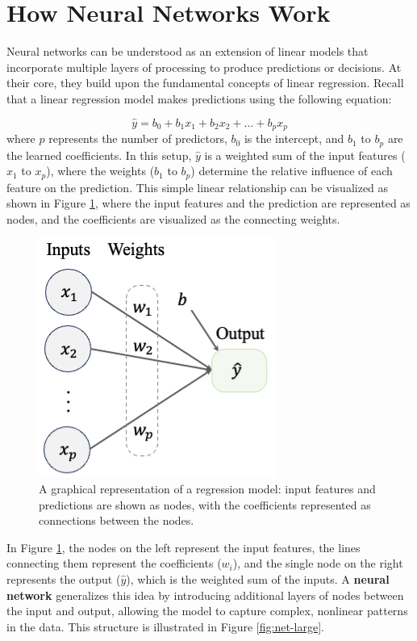 \documentclass[
]{book}
\theoremstyle{definition}
\theoremstyle{definition}
\theoremstyle{definition}
\theoremstyle{definition}
\theoremstyle{remark}
\begin{document}
\section{How Neural Networks Work}\label{how-neural-networks-work}

Neural networks can be understood as an extension of linear models that incorporate multiple layers of processing to produce predictions or decisions. At their core, they build upon the fundamental concepts of linear regression. Recall that a linear regression model makes predictions using the following equation:

\[
\hat{y} = b_0 + b_1 x_1 + b_2 x_2 + \dots + b_p x_p
\]
where \(p\) represents the number of predictors, \(b_0\) is the intercept, and \(b_1\) to \(b_p\) are the learned coefficients. In this setup, \(\hat{y}\) is a weighted sum of the input features (\(x_1\) to \(x_p\)), where the weights (\(b_1\) to \(b_p\)) determine the relative influence of each feature on the prediction. This simple linear relationship can be visualized as shown in Figure \ref{fig:net-reg}, where the input features and the prediction are represented as nodes, and the coefficients are visualized as the connecting weights.

\begin{figure}

{\centering \includegraphics[width=0.4\linewidth]{images/net_reg} 

}

\caption{A graphical representation of a regression model: input features and predictions are shown as nodes, with the coefficients represented as connections between the nodes.}\label{fig:net-reg}
\end{figure}

In Figure \ref{fig:net-reg}, the nodes on the left represent the input features, the lines connecting them represent the coefficients (\(w_i\)), and the single node on the right represents the output (\(\hat{y}\)), which is the weighted sum of the inputs. A \textbf{neural network} generalizes this idea by introducing additional layers of nodes between the input and output, allowing the model to capture complex, nonlinear patterns in the data. This structure is illustrated in Figure \ref{fig:net-large}.
\end{document}
